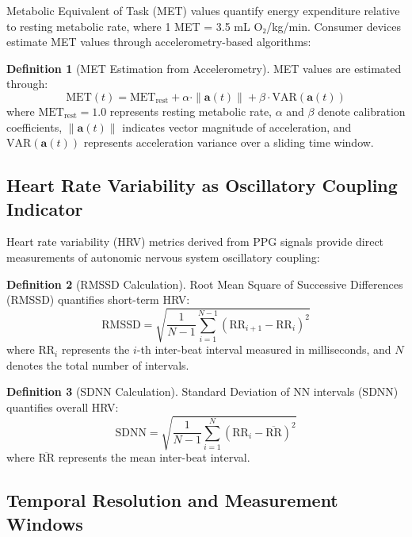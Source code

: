 \documentclass[12pt,a4paper]{article}
\theoremstyle{definition}
\newtheorem{definition}{Definition}[section]
\begin{document}
Metabolic Equivalent of Task (MET) values quantify energy expenditure relative to resting metabolic rate, where 1 MET = 3.5 mL O₂/kg/min. Consumer devices estimate MET values through accelerometry-based algorithms:

\begin{definition}[MET Estimation from Accelerometry]
MET values are estimated through:
\begin{equation}
\text{MET}(t) = \text{MET}_{\text{rest}} + \alpha \cdot \|\mathbf{a}(t)\| + \beta \cdot \text{VAR}(\mathbf{a}(t))
\end{equation}
where $\text{MET}_{\text{rest}} = 1.0$ represents resting metabolic rate, $\alpha$ and $\beta$ denote calibration coefficients, $\|\mathbf{a}(t)\|$ indicates vector magnitude of acceleration, and $\text{VAR}(\mathbf{a}(t))$ represents acceleration variance over a sliding time window.
\end{definition}

\subsection{Heart Rate Variability as Oscillatory Coupling Indicator}

Heart rate variability (HRV) metrics derived from PPG signals provide direct measurements of autonomic nervous system oscillatory coupling:

\begin{definition}[RMSSD Calculation]
Root Mean Square of Successive Differences (RMSSD) quantifies short-term HRV:
\begin{equation}
\text{RMSSD} = \sqrt{\frac{1}{N-1} \sum_{i=1}^{N-1} (\text{RR}_{i+1} - \text{RR}_i)^2}
\end{equation}
where $\text{RR}_i$ represents the $i$-th inter-beat interval measured in milliseconds, and $N$ denotes the total number of intervals.
\end{definition}

\begin{definition}[SDNN Calculation]
Standard Deviation of NN intervals (SDNN) quantifies overall HRV:
\begin{equation}
\text{SDNN} = \sqrt{\frac{1}{N-1} \sum_{i=1}^{N} (\text{RR}_i - \overline{\text{RR}})^2}
\end{equation}
where $\overline{\text{RR}}$ represents the mean inter-beat interval.
\end{definition}

\subsection{Temporal Resolution and Measurement Windows}
\end{document}
